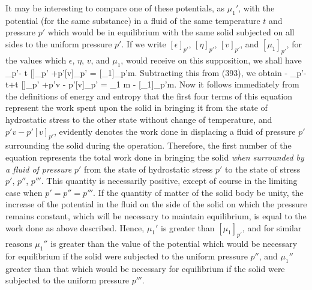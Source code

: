 \documentclass[12pt]{memoir}
\begin{document}
{It may be interesting to compare one of these potentials, as $\mu_1'$, with the potential (for the same substance) in a fluid of the same temperature $t$ and pressure $p'$ which would be in equilibrium with the same solid subjected on all sides to the uniform pressure $p'$. If we write $[\epsilon]_{p'}$, $[\eta]_{p'}$, $[v]_{p'}$, and $[\mu_1]_{p'}$, for the values which $\epsilon$, $\eta$, $v$, and $\mu_1$, would receive on this supposition, we shall have
\eqs \left[\epsilon\right]_{p'}- t [\eta]_{p'} +p'[v]_{p'} = [\mu_1]_{p'}m.  \label{396}\eqe
Subtracting this from (393), we obtain
\eqs \epsilon - \left[\epsilon\right]_{p'}- t\eta+t [\eta]_{p'} +p'v - p'[v]_{p'} = \mu_1 m - [\mu_1]_{p'}m. \label{397}\eqe
Now it follows immediately from the definitions of energy and entropy that the first four terms of this equation represent the work spent upon the solid in bringing it from the state of hydrostatic stress to the other state without change of temperature, and $p'v-p'[v]_{p'}$, evidently denotes the work done in displacing a fluid of pressure $p'$ surrounding the solid during the operation. Therefore, the first number of the equation represents the total work done in bringing the solid \textit{when surrounded by a fluid of pressure} $p'$ from the state of hydrostatic stress $p'$ to the state of stress $p'$, $p''$, $p'''$. This quantity is necessarily positive, except of course in the limiting case when $p'=p''=p'''$. If the quantity of matter of the solid body be unity, the increase of the potential in the fluid on the side of the solid on which the pressure remains constant, which will be necessary to maintain equilibrium, is equal to the work done as above described. Hence, $\mu_1'$ is greater than $[\mu_1]_{p'}$, and for similar reasons $\mu_1''$ is greater than the value of the potential which would be necessary for equilibrium if the solid were subjected to the uniform pressure $p''$, and $\mu_1''$ greater than that which would be necessary for equilibrium if the solid were subjected to the uniform pressure $p'''$.
}
\end{document}

